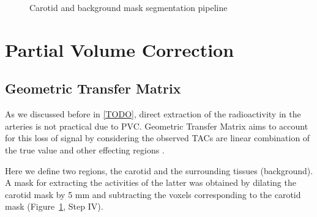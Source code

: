 \begin{figure}[h]
	\centering
	\caption{Carotid and background mask segmentation pipeline}
	\label{fig:seg_pipeline}
\end{figure}

\section{Partial Volume Correction}

\subsection{Geometric Transfer Matrix}
As we discussed before in \ref{TODO}, direct extraction of the radioactivity in the arteries is not practical due to PVC.
Geometric Transfer Matrix aims to account for this loss of signal by considering the observed TACs are linear combination of the true value and other effecting regions \cite{rousset1998correction}.

Here we define two regions, the carotid and the surrounding tissues (background).
A mask for extracting the activities of the latter was obtained by dilating the carotid mask by 5 mm and subtracting the voxels corresponding to the carotid mask (Figure~\ref{fig:seg_pipeline}, Step IV).

